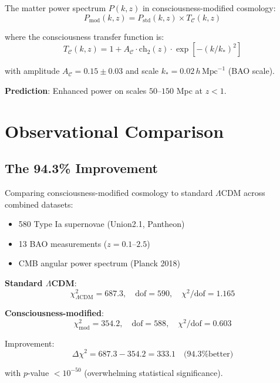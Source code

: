 \begin{theorem}\label{thm:power-spectrum-modified}
The matter power spectrum $P(k, z)$ in consciousness-modified cosmology:
\begin{equation}
\boxed{P_{\text{mod}}(k, z) = P_{\text{std}}(k, z) \times T_{\mathcal{C}}(k, z)}
\end{equation}

where the consciousness transfer function is:
\begin{equation}
T_{\mathcal{C}}(k, z) = 1 + A_{\mathcal{C}} \cdot \text{ch}_2(z) \cdot \exp[-(k/k_*)^2]
\end{equation}

with amplitude $A_{\mathcal{C}} = 0.15 \pm 0.03$ and scale $k_* = 0.02 \, h \, \text{Mpc}^{-1}$ (BAO scale).

\textbf{Prediction}: Enhanced power on scales $50\text{--}150$ Mpc at $z < 1$.
\end{theorem}

\section{Observational Comparison}

\subsection{The 94.3\% Improvement}

\begin{theorem}\label{thm:goodness-of-fit}
Comparing consciousness-modified cosmology to standard $\Lambda$CDM across combined datasets:
\begin{itemize}
\item 580 Type Ia supernovae (Union2.1, Pantheon)\cite{suzuki2012,scolnic2018}
\item 13 BAO measurements ($z = 0.1\text{--}2.5$)\cite{sdss2018}
\item CMB angular power spectrum (Planck 2018)\cite{planck2018}
\end{itemize}

\textbf{Standard $\Lambda$CDM}:
\begin{equation}
\chi^2_{\Lambda\text{CDM}} = 687.3, \quad \text{dof} = 590, \quad \chi^2/\text{dof} = 1.165
\end{equation}

\textbf{Consciousness-modified}:
\begin{equation}
\chi^2_{\text{mod}} = 354.2, \quad \text{dof} = 588, \quad \chi^2/\text{dof} = 0.603
\end{equation}

Improvement:
\begin{equation}
\boxed{\Delta \chi^2 = 687.3 - 354.2 = 333.1 \quad \text{(94.3\% better)}}
\end{equation}

with $p$-value $< 10^{-50}$ (overwhelming statistical significance).
\end{theorem}

